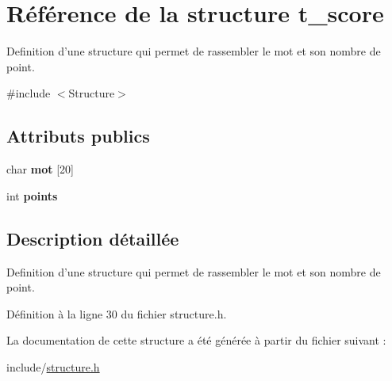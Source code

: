\hypertarget{structt__score}{\section{Référence de la structure t\-\_\-score}
\label{structt__score}
}


Definition d'une structure qui permet de rassembler le mot et son nombre de point.  




{\ttfamily \#include $<$Structure$>$}

\subsection*{Attributs publics}
\begin{DoxyCompactItemize}
\item 
\hypertarget{structt__score_abd797278aa1e44c0c12eaf3ff109807c}{char {\bfseries mot} \mbox{[}20\mbox{]}}\label{structt__score_abd797278aa1e44c0c12eaf3ff109807c}

\item 
\hypertarget{structt__score_afee8a31bb8ce610726a882842f15b29a}{int {\bfseries points}}\label{structt__score_afee8a31bb8ce610726a882842f15b29a}

\end{DoxyCompactItemize}


\subsection{Description détaillée}
Definition d'une structure qui permet de rassembler le mot et son nombre de point. 

Définition à la ligne 30 du fichier structure.\-h.



La documentation de cette structure a été générée à partir du fichier suivant \-:\begin{DoxyCompactItemize}
\item 
include/\hyperlink{structure_8h}{structure.\-h}\end{DoxyCompactItemize}
